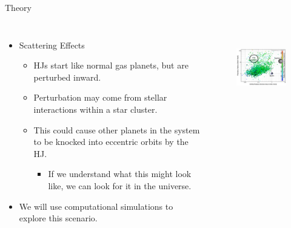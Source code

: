 \documentclass{beamer}
\begin{document}
\begin{frame}{Theory}
    \begin{columns}
        \begin{itemize}
            \item Scattering Effects
                \begin{itemize}
                    \item HJs start like normal gas planets, but are perturbed inward.
                    \item Perturbation may come from stellar interactions
                        within a star cluster.
                    \item This could cause other planets in the system to be
                        knocked into eccentric orbits by the HJ.
                        \begin{itemize}
                            \item If we understand what this might look like,
                                we can look for it in the universe.
                        \end{itemize}
                \end{itemize}
            \item We will use computational simulations to explore this scenario.
        \end{itemize}
            \begin{figure}
                \centering
                \includegraphics[height=1.25in]{hot_jupiter_measure_plot}
            \end{figure}
    \end{columns}
\end{frame}
\end{document}
